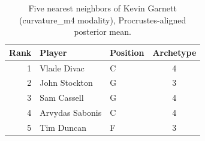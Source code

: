 \begin{table}[htbp]
  \centering\small
  \begin{tabular}{rllc}
    \toprule
    Rank & Player & Position & Archetype \\
    \midrule
    1 & Vlade Divac & C & 4 \\
    2 & John Stockton & G & 3 \\
    3 & Sam Cassell & G & 4 \\
    4 & Arvydas Sabonis & C & 4 \\
    5 & Tim Duncan & F & 3 \\
    \bottomrule
  \end{tabular}
  \caption{Five nearest neighbors of Kevin Garnett (curvature_m4 modality), Procrustes-aligned posterior mean.}
  \label{tab:Kevin_Garnett_neighbors_curvature_m4}
\end{table}

